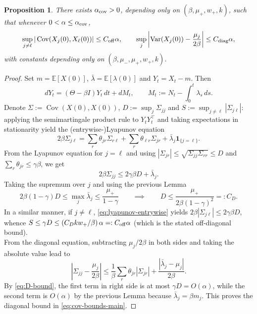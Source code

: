\documentclass{article}
\newtheorem{proposition}{Proposition}[section]
\newcommand{\E}{\mathbb{E}}
\newcommand{\Cov}{\operatorname{Cov}}
\newcommand{\Var}{\operatorname{Var}}
\newcommand{\ind}{\mathbf 1}
\begin{document}
\begin{proposition}
\label{prop:cov-perturb}
There exists $\alpha_{\rm cov}>0$, depending only on $(\beta,\mu_+,w_+,k)$, such that whenever $0<\alpha\le \alpha_{\rm cov}$,
\begin{equation}
\label{eq:cov-bounds-main}
\sup_{j\neq \ell}|\Cov(X_j(0),X_\ell(0))|\le C_{\rm off}\alpha,
\qquad
\sup_j \left|\Var(X_j(0))-\frac{\mu_j}{2\beta}\right|\le C_{\rm diag}\alpha,
\end{equation}
with constants depending only on $(\beta,\mu_-,\mu_+,w_+,k)$.
\end{proposition}
\begin{proof}
Set $m=\E[X(0)]$, $\bar\lambda=\E[\lambda(0)]$ and $Y_t=X_t-m$. Then
\[
dY_t=(\Theta-\beta I)Y_t\,dt+dM_t,
\qquad
M_t:=N_t-\int_0^t\lambda_s\,ds.
\]
Denote $\Sigma:=\Cov(X(0),X(0))$, $ D:=\sup_j \Sigma_{jj}$ and $S:=\sup_{j\neq\ell}|\Sigma_{j\ell}|$: applying the semimartingale product rule to $Y_tY_t^\top$ and taking expectations in stationarity yield the (entrywise-)Lyapunov equation
\begin{equation}
\label{eq:lyapunov-entrywise}
2\beta\Sigma_{j\ell}
=
\sum_r \theta_{jr}\Sigma_{r\ell}
+
\sum_r \theta_{\ell r}\Sigma_{jr}
+
\bar\lambda_j\ind_{\{j=\ell\}}.
\end{equation}
From the Lyapunov equation for $j=\ell$ and using $|\Sigma_{jr}|\le \sqrt{\Sigma_{jj}\Sigma_{rr}}\le D$ and $\sum_r\theta_{jr}\le \gamma \beta$, we get
\[
2\beta\Sigma_{jj}\le 2\gamma \beta D+\bar\lambda_j.
\] 
Taking the supremum over $j$ and using the previous Lemma
\begin{equation}
\label{eq:D-bound}
2\beta(1-\gamma)D\le \max_j \bar\lambda_j \le \frac{\mu_+}{1-\gamma} \qquad \implies \qquad D\le \frac{\mu_+}{2\beta(1-\gamma)^2}=:C_D.
\end{equation}
In a similar manner, if $j\neq \ell$, \eqref{eq:lyapunov-entrywise} yields $2\beta|\Sigma_{j\ell}|\le 2\gamma\beta D$, whence $S\le \gamma D \le (C_D k w_+/\beta)\,\alpha =: C_{\rm off}\alpha$ (which is the stated off-diagonal bound).\\
From the diagonal equation, subtracting $\mu_j/2\beta$ in both sides and taking the absolute value lead to
\[
\left|\Sigma_{jj}-\frac{\mu_j}{2\beta}\right|
\le \frac{1}{\beta}\sum_r \theta_{jr}|\Sigma_{jr}| + \frac{|\bar\lambda_j-\mu_j|}{2\beta}.
\]
By \eqref{eq:D-bound}, the first term in right side is at most $\gamma D=O(\alpha)$, while the second term is $O(\alpha)$ by the previous Lemma because $\bar\lambda_j=\beta m_j$. This proves the diagonal bound in \eqref{eq:cov-bounds-main}. 
\end{proof}
\end{document}
